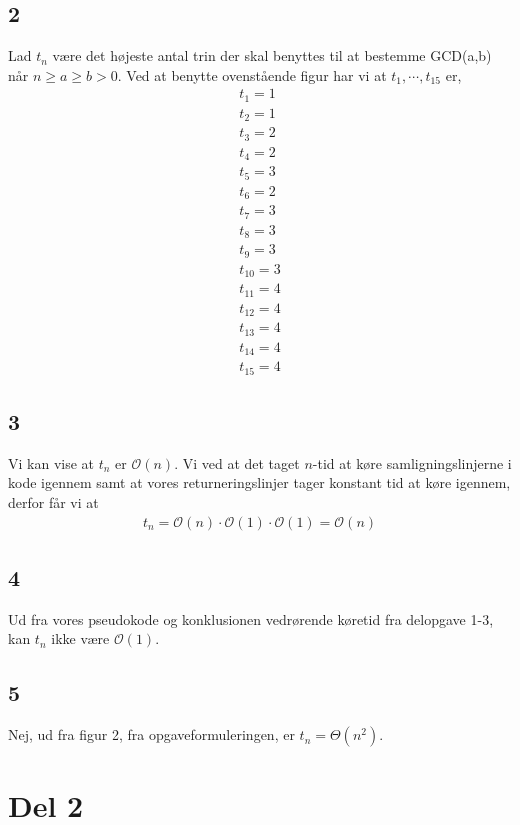 \documentclass[a4paper]{article}
\begin{document}
\subsection*{2}
Lad $t_n$ være det højeste antal trin der skal benyttes til at bestemme GCD(a,b) når $n \geq a \geq b > 0$. Ved at benytte ovenstående figur har vi at $t_1,\cdots,t_{15}$ er,
\begin{align*}
t_1 = 1 \\
t_2 = 1 \\
t_3 = 2 \\
t_4 = 2 \\
t_5 = 3 \\
t_6 = 2 \\
t_7 = 3 \\
t_8 = 3 \\
t_9 = 3 \\
t_{10} = 3 \\
t_{11} = 4 \\
t_{12} = 4 \\
t_{13} = 4 \\
t_{14} = 4 \\
t_{15} = 4
\end{align*}

\subsection*{3}
Vi kan vise at $t_n$ er $\mathcal{O}(n)$. Vi ved at det taget $n$-tid at køre samligningslinjerne i kode igennem samt at vores returneringslinjer tager konstant tid at køre igennem, derfor får vi at
\begin{align*}
t_n = \mathcal{O}(n) \cdot \mathcal{O}(1) \cdot \mathcal{O}(1) = \mathcal{O}(n)
\end{align*}

\subsection*{4}
Ud fra vores pseudokode og konklusionen vedrørende køretid fra delopgave 1-3, \\
kan $t_n$ ikke være $\mathcal{O}(1)$.

\subsection*{5}
Nej, ud fra figur 2, fra opgaveformuleringen, er $t_n = \Theta(n^2)$.

\section*{Del 2}  
\end{document}
